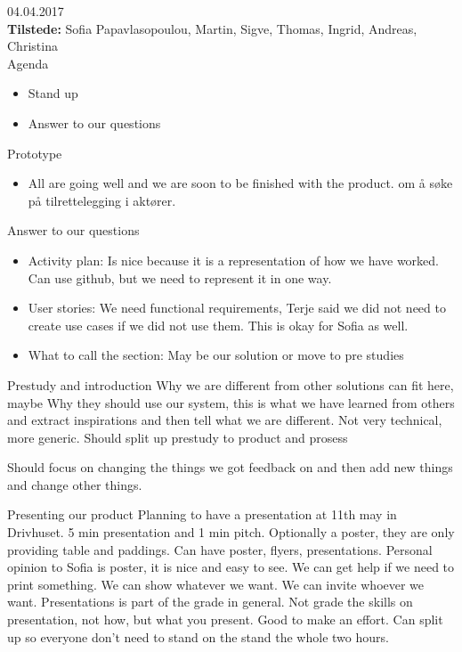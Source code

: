 {\huge{04.04.2017}}\\
\textbf{Tilstede:} Sofia Papavlasopoulou, Martin, Sigve, Thomas, Ingrid, Andreas, Christina\\


{\Large{Agenda}}
\begin{itemize} 
    \item Stand up
    \item Answer to our questions
\end{itemize} 

{\large{Prototype}}
\begin{itemize}  
    \item All are going well and we are soon to be finished with the product. om å søke på tilrettelegging i aktører.
\end{itemize}

{\large{Answer to our questions}}
\begin{itemize}  
    \item Activity plan: Is nice because it is a representation of how we have worked. Can use github, but we need to represent it in one way.
    \item User stories: We need functional requirements, Terje said we did not need to create use cases if we did not use them. This is okay for Sofia as well.
    \item What to call the section: May be our solution or move to pre studies
\end{itemize}




Prestudy and introduction
Why we are different from other solutions can fit here, maybe
Why they should use our system, this is what we have learned from others and extract inspirations and then tell what we are different. Not very technical, more generic. 
Should split up prestudy to product and prosess

Should focus on changing the things we got feedback on and then add new things and change other things.

Presenting our product
Planning to have a presentation at 11th may in Drivhuset. 5 min presentation and 1 min pitch. 
Optionally a poster, they are only providing table and paddings. Can have poster, flyers, presentations. Personal opinion to Sofia is poster, it is nice and easy to see. 
We can get help if we need to print something.
We can show whatever we want. 
We can invite whoever we want.
Presentations is part of the grade in general. Not grade the skills on presentation, not how, but what you present. Good to make an effort.
Can split up so everyone don’t need to stand on the stand the whole two hours.


